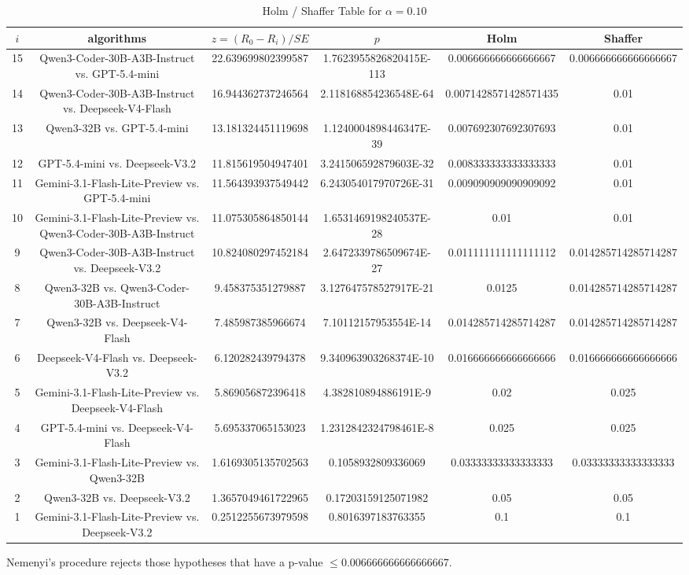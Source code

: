 \documentclass[a4paper,10pt]{article}
\begin{document}
\begin{landscape}
\begin{table}[!htp]
\centering\tiny
\caption{Holm / Shaffer Table for $\alpha=0.10$}
\begin{tabular}{cccccc}
$i$&algorithms&$z=(R_0 - R_i)/SE$&$p$&Holm&Shaffer\\
\hline
15&Qwen3-Coder-30B-A3B-Instruct vs. GPT-5.4-mini&22.639699802399587&1.7623955826820415E-113&0.006666666666666667&0.006666666666666667\\14&Qwen3-Coder-30B-A3B-Instruct vs. Deepseek-V4-Flash&16.944362737246564&2.118168854236548E-64&0.0071428571428571435&0.01\\13&Qwen3-32B vs. GPT-5.4-mini&13.181324451119698&1.1240004898446347E-39&0.007692307692307693&0.01\\12&GPT-5.4-mini vs. Deepseek-V3.2&11.815619504947401&3.241506592879603E-32&0.008333333333333333&0.01\\11&Gemini-3.1-Flash-Lite-Preview vs. GPT-5.4-mini&11.564393937549442&6.243054017970726E-31&0.009090909090909092&0.01\\10&Gemini-3.1-Flash-Lite-Preview vs. Qwen3-Coder-30B-A3B-Instruct&11.075305864850144&1.6531469198240537E-28&0.01&0.01\\9&Qwen3-Coder-30B-A3B-Instruct vs. Deepseek-V3.2&10.824080297452184&2.6472339786509674E-27&0.011111111111111112&0.014285714285714287\\8&Qwen3-32B vs. Qwen3-Coder-30B-A3B-Instruct&9.458375351279887&3.127647578527917E-21&0.0125&0.014285714285714287\\7&Qwen3-32B vs. Deepseek-V4-Flash&7.485987385966674&7.10112157953554E-14&0.014285714285714287&0.014285714285714287\\6&Deepseek-V4-Flash vs. Deepseek-V3.2&6.120282439794378&9.340963903268374E-10&0.016666666666666666&0.016666666666666666\\5&Gemini-3.1-Flash-Lite-Preview vs. Deepseek-V4-Flash&5.869056872396418&4.382810894886191E-9&0.02&0.025\\4&GPT-5.4-mini vs. Deepseek-V4-Flash&5.695337065153023&1.2312842324798461E-8&0.025&0.025\\3&Gemini-3.1-Flash-Lite-Preview vs. Qwen3-32B&1.6169305135702563&0.1058932809336069&0.03333333333333333&0.03333333333333333\\2&Qwen3-32B vs. Deepseek-V3.2&1.3657049461722965&0.17203159125071982&0.05&0.05\\1&Gemini-3.1-Flash-Lite-Preview vs. Deepseek-V3.2&0.2512255673979598&0.8016397183763355&0.1&0.1\\\hline
\end{tabular}
\end{table}
Nemenyi's procedure rejects those hypotheses that have a p-value $\le0.006666666666666667$.



\end{landscape}
\end{document}
